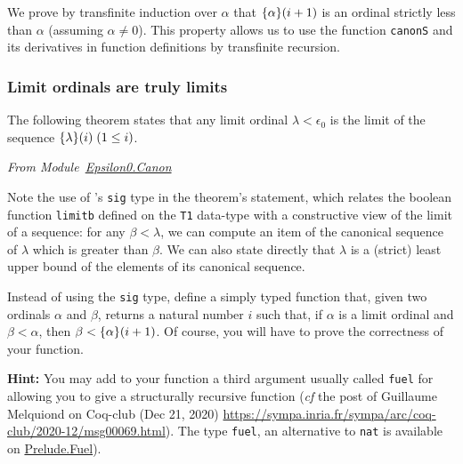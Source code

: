 
We prove by transfinite induction over $\alpha$ that $\mbox{$\{\alpha\}(i+1)$}$ is an ordinal strictly less than $\alpha$ (assuming $\alpha\not=0$). This property allows us to use the function \texttt{canonS} and its derivatives in function definitions by transfinite recursion.

\label{lemma:canonS_LT}



\subsubsection{Limit ordinals are truly limits}
The following theorem states that any limit ordinal $\lambda<\epsilon_0$ 
is the limit of the sequence $\mbox{$\{\lambda\}(i)$}\;(1\le i)$.


\vspace{4pt}

\emph{From Module~\href{../theories/html/hydras.Epsilon0.Canon.html\#canonS_limit_strong}{Epsilon0.Canon}}



\label{lemma:canonS-limit}


Note the use of \coq's \texttt{sig} type in the theorem's statement, which
relates the boolean function \texttt{limitb} defined on the \texttt{T1} data-type with a constructive view of the limit of a sequence: for any $\beta<\lambda$, we can compute an item of the canonical sequence of $\lambda$ which is greater than $\beta$.
We can also state directly that $\lambda$ is a (strict) least upper bound of the elements of its canonical sequence.




\begin{exercise}\label{exo:simply-typed-canonseq}
Instead of using the \texttt{sig} type, define a simply typed function that, given two ordinals $\alpha$ and $\beta$, returns a natural number $i$ such that, if $\alpha$ is a limit ordinal and $\beta<\alpha$, then $\beta< \mbox{$\{\alpha\}(i+1)$}$. Of course, you will have to prove the correctness of your function. 

\textbf{Hint:} You may add to your function a third argument usually called \texttt{fuel} for allowing you to give a structurally 
recursive function (\emph{cf} the post of Guillaume Melquiond on Coq-club (Dec 21, 2020)
\url{https://sympa.inria.fr/sympa/arc/coq-club/2020-12/msg00069.html}).
The type \texttt{fuel}, an alternative 
to \texttt{nat} is available on \href{../theories/html/hydras.Prelude.Fuel.html}{Prelude.Fuel}).

\end{exercise}






